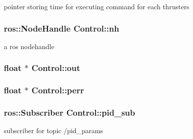 pointer storing time for executing command for each thrusters 

\subsubsection[{\texorpdfstring{nh}{nh}}]{\setlength{\rightskip}{0pt plus 5cm}ros\+::\+Node\+Handle Control\+::nh\hspace{0.3cm}{\ttfamily [private]}}\hypertarget{classControl_a8aa280a2e58b01b8cc3a62f839b28761}{}\label{classControl_a8aa280a2e58b01b8cc3a62f839b28761}


a ros nodehandle 

\subsubsection[{\texorpdfstring{out}{out}}]{\setlength{\rightskip}{0pt plus 5cm}float $\ast$ Control\+::out\hspace{0.3cm}{\ttfamily [private]}}\hypertarget{classControl_a7aae00ff04e44453c56e0b4c500f902c}{}\label{classControl_a7aae00ff04e44453c56e0b4c500f902c}
\subsubsection[{\texorpdfstring{perr}{perr}}]{\setlength{\rightskip}{0pt plus 5cm}float $\ast$ Control\+::perr\hspace{0.3cm}{\ttfamily [private]}}\hypertarget{classControl_ae1e9586e4f965eece100084c550f2b39}{}\label{classControl_ae1e9586e4f965eece100084c550f2b39}
\subsubsection[{\texorpdfstring{pid\+\_\+sub}{pid_sub}}]{\setlength{\rightskip}{0pt plus 5cm}ros\+::\+Subscriber Control\+::pid\+\_\+sub\hspace{0.3cm}{\ttfamily [private]}}\hypertarget{classControl_adee654d9ea9ce8b55e7a54f24b9bc8cf}{}\label{classControl_adee654d9ea9ce8b55e7a54f24b9bc8cf}


subscriber for topic /pid\+\_\+params 

